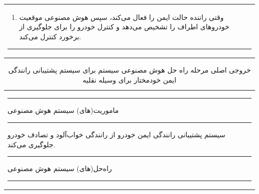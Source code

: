 \documentclass[a4paper,10pt]{article}
\begin{document}
\begin{table}[htbp]
\begin{tabularx}{\textwidth}{X}
\begin{enumerate}
                        \item وقتی راننده حالت ایمن را فعال می‌کند، سپس هوش مصنوعی موقعیت خودروهای اطراف را تشخیص می‌دهد و کنترل خودرو را برای جلوگیری از برخورد کنترل می‌کند.

                    \end{enumerate}

                    \hrule

                \end{tabularx}
                
            \end{table}

            \begin{table}[htbp]
                
                \centering
                \caption{خروجی اصلی مرحله راه حل هوش مصنوعی سیستم برای سیستم پشتیبانی رانندگی ایمن خودمختار برای وسیله نقلیه}

                \vspace{-5pt}

                \begin{tabularx}{\textwidth}{ X }
                    
                    \hrule

                    ماموریت(های) سیستم هوش مصنوعی 

                    \vspace{3pt}
                    
                    \hrule

                    \vspace{3pt}

                    سیستم پشتیبانی رانندگی ایمن خودرو از رانندگی خواب‌آلود و تصادف خودرو جلوگیری می‌کند. 

                    \vspace{3pt}

                    \hrule

                    \vspace{3pt}

                    راه‌حل(های) سیستم هوش مصنوعی 

                    \vspace{3pt}

                    \hrule

                    \vspace{3pt}


\end{tabularx}
\end{table}
\end{document}
